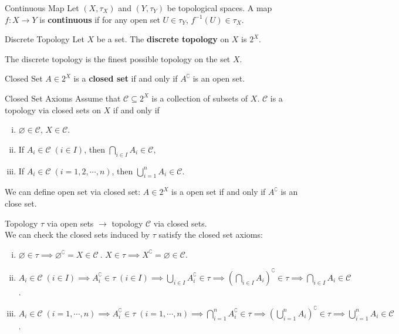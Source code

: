\documentclass{report}
\begin{document}
\begin{definition}{Continuous Map}{}
	Let $(X,\tau_X)$ and $(Y,\tau_Y)$ be topological spaces. A map $f:X\to Y$ is \textbf{continuous} if for any open set $U\in\tau_Y$, $f^{-1}(U)\in\tau_X$.
\end{definition}

\begin{definition}{Discrete Topology}{}
	Let $X$ be a set. The \textbf{discrete topology} on $X$ is $2^X$.
\end{definition}

The discrete topology is the finest possible topology on the set $X$.

\begin{definition}{Closed Set}{}
	$A\in 2^X$ is a \textbf{closed set} if and only if $A^{\complement}$ is an open set.
\end{definition}

\begin{definition}{Closed Set Axioms}{}
	Assume that $\mathcal{C}\subseteq2^X $ is a collection of subsets of $X$. $\mathcal{C}$ is a topology via closed sets on $X$ if and only if
	\begin{enumerate}[(i)]
		\item $\varnothing\in \mathcal{C}$, $X\in \mathcal{C}$.
		\item If $A_i\in\mathcal{C}\;(i\in I)$, then $\bigcap\limits_{i\in I}A_i\in \mathcal{C}$,
		\item If $A_i\in\mathcal{C}\;(i=1,2,\cdots,n)$, then $\bigcup\limits_{i=1}^nA_i\in \mathcal{C}$.
	\end{enumerate}
	We can define open set via closed set: $A\in 2^X$ is a open set if and only if $A^{\complement}$ is an close set.
\end{definition}


\begin{prf}
	Topology $\tau$ via open sets $\rightarrow$ topology $\mathcal{C}$ via closed sets.\\
	We can check the closed sets induced by $\tau$ satisfy the closed set axioms:
	\begin{enumerate}[(i)]
		\item $\varnothing\in \tau\implies\varnothing^{\complement}=X\in \mathcal{C} \ $. $X\in \tau\implies X^{\complement}=\varnothing\in \mathcal{C}$.
		\item $A_i\in\mathcal{C}\;(i\in I)\implies A_i^{\complement}\in\tau\;(i\in I)\implies\bigcup\limits_{i\in I}A_i^{\complement}\in \tau\implies \left(\bigcap\limits_{i\in I}A_i\right)^{\complement}\in \tau\implies\bigcap\limits_{i\in I}A_i\in\mathcal{C}$.
		\item $A_i\in\mathcal{C}\;(i=1,\cdots,n)\implies A_i^{\complement}\in\tau\;(i=1,\cdots,n)\implies\bigcap\limits_{i=1}^nA_i^{\complement}\in \tau\implies \left(\bigcup\limits_{i=1}^nA_i\right)^{\complement}\in \tau\implies\bigcup\limits_{i=1}^nA_i\in\mathcal{C}$.
	\end{enumerate}
\end{prf}
\end{document}
